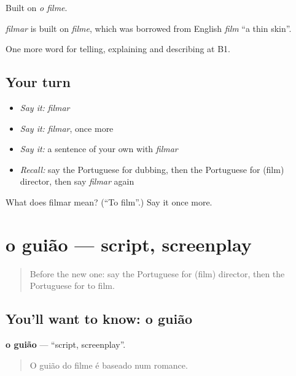 Built on \emph{o filme}.

\begin{cousinweb}
\emph{filmar} is built on \emph{filme}, which was borrowed from English \emph{film} \textquotedblleft{}a thin skin\textquotedblright{}.
\end{cousinweb}

\begin{grammarlens}[title={What you've built}]
One more word for telling, explaining and describing at B1.
\end{grammarlens}

\subsection*{Your turn}
\begin{itemize}
\raggedright
  \item \emph{Say it:} \emph{filmar}
  \item \emph{Say it:} \emph{filmar}, once more
  \item \emph{Say it:} a sentence of your own with \emph{filmar}
  \item \emph{Recall:} say the Portuguese for dubbing, then the Portuguese for (film) director, then say \emph{filmar} again
\end{itemize}

\begin{tcolorbox}[breakable,colback=teal!4,colframe=teal!35!black,title={Before you move on}]
What does filmar mean? (\textquotedblleft{}To film\textquotedblright{}.) Say it once more.
\end{tcolorbox}
\section[o guião]{o guião — script, screenplay}

\label{lesson:PT-C527-guiao}



\begin{quote}
Before the new one: say the Portuguese for (film) director, then the Portuguese for to film.
\end{quote}

\subsection*{You'll want to know: o guião}
\textbf{o guião} — \textquotedblleft{}script, screenplay\textquotedblright{}.

\begin{quote}
O guião do filme é baseado num romance.
\end{quote}

